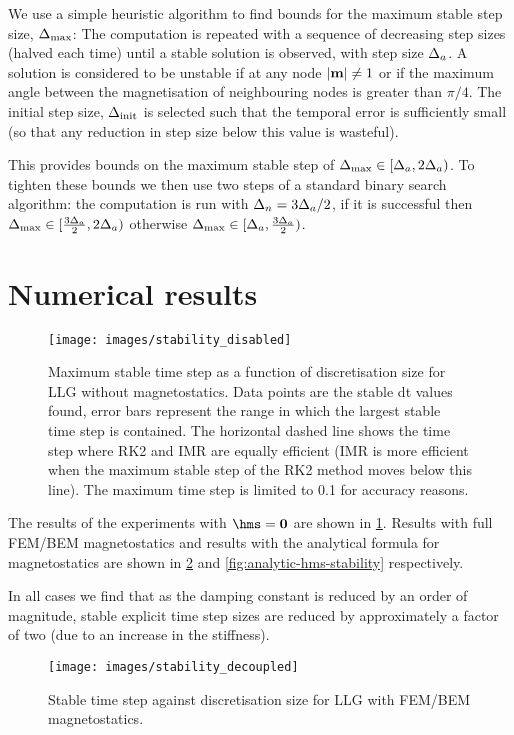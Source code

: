 We use a simple heuristic algorithm to find bounds for the maximum stable step size, $\Delta_{\mathrm{max}}$: The computation is repeated with a sequence of decreasing step sizes (halved each time) until a stable solution is observed, with step size $\Delta_{a}$. A solution is considered to be unstable if at any node $|\boldsymbol{\mathrm{m}}| \neq 1$ or if the maximum angle between the magnetisation of neighbouring nodes is greater than $\pi/4$. The initial step size, $\Delta_{\mathrm{init}}$ is selected such that the temporal error is sufficiently small (so that any reduction in step size below this value is wasteful).

This provides bounds on the maximum stable step of $\Delta_{\mathrm{max}} \in [\Delta_{a}, 2\Delta_{a})$. To tighten these bounds we then use two steps of a standard binary search algorithm: the computation is run with $\Delta_{n}{} = 3\Delta_{a}/2$, if it is successful then $\Delta_{\mathrm{max}} \in [\frac{3\Delta_{a}}{2}, 2\Delta_{a})$ otherwise $\Delta_{\mathrm{max}} \in [\Delta_{a}, \frac{3\Delta_{a}}{2})$.

\section{Numerical results}


\begin{figure}
  \centering
  \texttt{[image: images/stability\_disabled]}
  \caption{Maximum stable time step as a function of discretisation size for LLG without magnetostatics. Data points are the stable dt values found, error bars represent the range in which the largest stable time step is contained. The horizontal dashed line shows the time step where RK2 and IMR are equally efficient (IMR is more efficient when the maximum stable step of the RK2 method moves below this line). The maximum time step is limited to 0.1 for accuracy reasons.}
  \label{fig:no-hms-stability}
\end{figure}


The results of the experiments with $\hms = \zerov$ are shown in \cref{fig:no-hms-stability}.
Results with full FEM/BEM magnetostatics and results with the analytical formula for magnetostatics are shown in \cref{fig:hms-stability} and \ref{fig:analytic-hms-stability} respectively.

In all cases we find that as the damping constant is reduced by an order of magnitude, stable explicit time step sizes are reduced by approximately a factor of two (due to an increase in the stiffness).

\begin{figure}
  \centering
  \texttt{[image: images/stability\_decoupled]}
  \caption{Stable time step against discretisation size for LLG with FEM/BEM magnetostatics.}
  \label{fig:hms-stability}
\end{figure}


